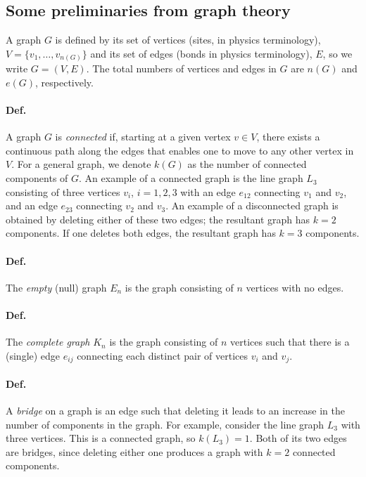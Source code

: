 \subsection{Some preliminaries from graph theory}

A graph $G$ is defined by its set of vertices (sites, in physics terminology), $V = \{v_1,\ldots,v_{n(G)}\}$ and its set of
edges (bonds in physics terminology), $E$, so we write $G = (V,E)$. The total numbers of vertices and edges in $G$ are
$n(G)$ and $e(G)$, respectively.

\paragraph{Def.} A graph $G$ is \emph{connected} if, starting at a given vertex $v\in V$, there exists a continuous path along
the edges that enables one to move to any other vertex in $V$. For a general graph, we denote $k(G)$ as the number of
connected components of $G$. An example of a connected graph is the line graph $L_3$ consisting of three vertices $v_i$,
$i = 1,2,3$ with an edge $e_{12}$ connecting $v_1$ and $v_2$, and an edge $e_{23}$ connecting $v_2$ and $v_3$. An example
of a disconnected graph is obtained by deleting either of these two edges; the resultant graph has $k = 2$ components. If
one deletes both edges, the resultant graph has $k = 3$ components.

\paragraph{Def.} The \emph{empty} (null) graph $E_n$ is the graph consisting of $n$ vertices with no edges.

\paragraph{Def.} The \emph{complete graph} $K_n$ is the graph consisting of $n$ vertices such that there is a (single) edge
$e_{ij}$ connecting each distinct pair of vertices $v_i$ and $v_j$.

\paragraph{Def.} A \emph{bridge} on a graph is an edge such that deleting it leads to an increase in the number of components
in the graph. For example, consider the line graph $L_3$ with three vertices. This is a connected graph, so $k(L_3) = 1$.
Both of its two edges are bridges, since deleting either one produces a graph with $k = 2$ connected components.

